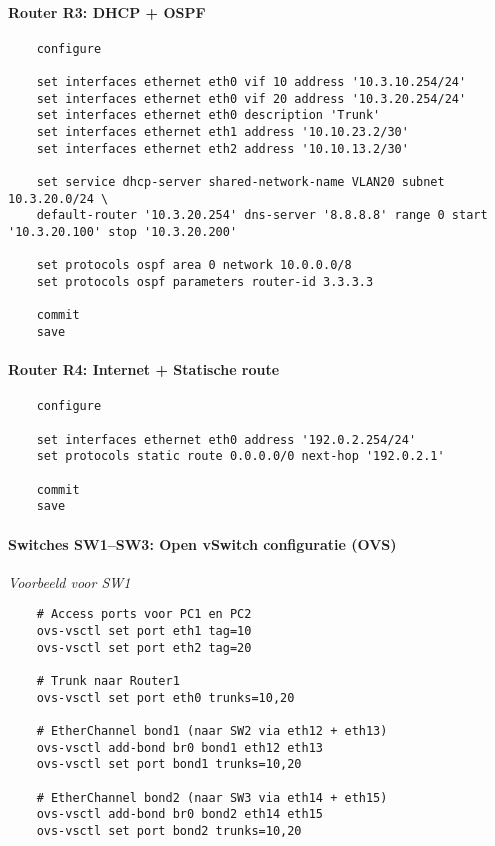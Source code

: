 \vspace{0.3cm}
\paragraph{Router R3: DHCP + OSPF}
\begin{verbatim}
    configure
    
    set interfaces ethernet eth0 vif 10 address '10.3.10.254/24'
    set interfaces ethernet eth0 vif 20 address '10.3.20.254/24'
    set interfaces ethernet eth0 description 'Trunk'
    set interfaces ethernet eth1 address '10.10.23.2/30'
    set interfaces ethernet eth2 address '10.10.13.2/30'
    
    set service dhcp-server shared-network-name VLAN20 subnet 10.3.20.0/24 \
    default-router '10.3.20.254' dns-server '8.8.8.8' range 0 start '10.3.20.100' stop '10.3.20.200'
    
    set protocols ospf area 0 network 10.0.0.0/8
    set protocols ospf parameters router-id 3.3.3.3
    
    commit
    save
\end{verbatim}

\vspace{0.3cm}

\paragraph{Router R4: Internet + Statische route}
\begin{verbatim}
    configure
    
    set interfaces ethernet eth0 address '192.0.2.254/24'
    set protocols static route 0.0.0.0/0 next-hop '192.0.2.1'
    
    commit
    save
\end{verbatim}

\vspace{0.3cm}
\paragraph{Switches SW1–SW3: Open vSwitch configuratie (OVS)}
\textit{Voorbeeld voor SW1}
\begin{verbatim}
    # Access ports voor PC1 en PC2
    ovs-vsctl set port eth1 tag=10
    ovs-vsctl set port eth2 tag=20
    
    # Trunk naar Router1
    ovs-vsctl set port eth0 trunks=10,20
    
    # EtherChannel bond1 (naar SW2 via eth12 + eth13)
    ovs-vsctl add-bond br0 bond1 eth12 eth13
    ovs-vsctl set port bond1 trunks=10,20
    
    # EtherChannel bond2 (naar SW3 via eth14 + eth15)
    ovs-vsctl add-bond br0 bond2 eth14 eth15
    ovs-vsctl set port bond2 trunks=10,20
\end{verbatim}

